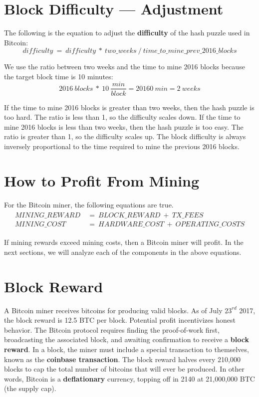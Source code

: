 \documentclass[full.tex]{subfiles}
\begin{document}
    \section*{Block Difficulty --- Adjustment}
    
    \noindent The following is the equation to adjust the \textbf{difficulty} of the hash puzzle used in Bitcoin:
    $$\mathit{difficulty}~=~\mathit{difficulty~*~two\_weeks~/~time\_to\_mine\_prev\_2016\_blocks}$$
    
    \noindent We use the ratio between two weeks and the time to mine 2016 blocks because the target block time is 10 minutes:
    $$\mathit{2016~blocks~*~10~\frac{min}{block}=20160~min=2~weeks}$$
    
    If the time to mine 2016 blocks is greater than two weeks, then the hash puzzle is too hard. The ratio is less than 1, so the difficulty scales down. If the time to mine 2016 blocks is less than two weeks, then the hash puzzle is too easy. The ratio is greater than 1, so the difficulty scales up. The block difficulty is always inversely proportional to the time required to mine the previous 2016 blocks.
    
    \section*{How to Profit From Mining}
    
    \noindent For the Bitcoin miner, the following equations are true.
    \begin{align*}
        \begin{split}
            \mathit{MINING\_REWARD}~&=~\mathit{BLOCK\_REWARD~+~TX\_FEES} \\
            \mathit{MINING\_COST}~&=~\mathit{HARDWARE\_COST~+~OPERATING\_COSTS}
        \end{split}
    \end{align*}
    
    \noindent If mining rewards exceed mining costs, then a Bitcoin miner will profit. In the next sections, we will analyze each of the components in the above equations.
    
    \section*{Block Reward}
    
    A Bitcoin miner receives bitcoins for producing valid blocks. As of July $23^{rd}$ 2017, the block reward is 12.5 BTC per block. Potential profit incentivizes honest behavior. The Bitcoin protocol requires finding the proof-of-work first, broadcasting the associated block, and awaiting confirmation to receive a \textbf{block reward}. In a block, the miner must include a special transaction to themselves, known as the \textbf{coinbase transaction}. The block reward halves every 210,000 blocks to cap the total number of bitcoins that will ever be produced. In other words, Bitcoin is a \textbf{deflationary} currency, topping off in 2140 at 21,000,000 BTC (the supply cap).
    
\end{document}
